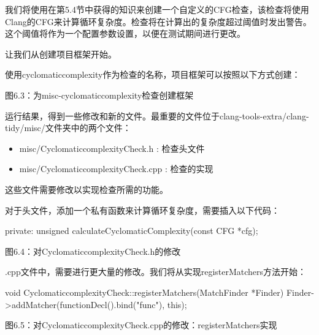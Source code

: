 我们将使用在第5.4节中获得的知识来创建一个自定义的CFG检查，该检查将使用Clang的CFG来计算循环复杂度。检查将在计算出的复杂度超过阈值时发出警告。这个阈值将作为一个配置参数设置，以便在测试期间进行更改。

让我们从创建项目框架开始。


使用cyclomaticcomplexity作为检查的名称，项目框架可以按照以下方式创建：


\begin{center}
图6.3：为misc-cyclomaticcomplexity检查创建框架
\end{center}

运行结果，得到一些修改和新的文件。最重要的文件位于clang-tools-extra/clang-tidy/misc/文件夹中的两个文件：

\begin{itemize}
\item
misc/CyclomaticcomplexityCheck.h : 检查头文件

\item
misc/CyclomaticcomplexityCheck.cpp : 检查的实现
\end{itemize}

这些文件需要修改以实现检查所需的功能。


对于头文件，添加一个私有函数来计算循环复杂度，需要插入以下代码：

\begin{cpp}
private:
  unsigned calculateCyclomaticComplexity(const CFG *cfg);
\end{cpp}

\begin{center}
图6.4：对CyclomaticcomplexityCheck.h的修改
\end{center}

.cpp文件中，需要进行更大量的修改。我们将从实现registerMatchers方法开始：

\begin{cpp}
void CyclomaticcomplexityCheck::registerMatchers(MatchFinder *Finder) {
  Finder->addMatcher(functionDecl().bind("func"), this);
}
\end{cpp}

\begin{center}
图6.5：对CyclomaticcomplexityCheck.cpp的修改：registerMatchers实现
\end{center}

